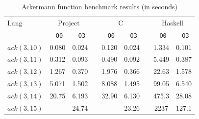 \begin{table}\centering
    \renewcommand{\arraystretch}{1.3}
    \label{tab:ackermann-benchmark}
    \caption{Ackermann function benchmark results (in seconds)}

    \begin{tabular}{@{}lcccccccc@{}} \toprule
        Lang        & \multicolumn{2}{c}{Project} &              & \multicolumn{2}{c}{C} &              & \multicolumn{2}{c}{Haskell}                                  \\
        \cmidrule{2-3} \cmidrule{5-6} \cmidrule{8-9}
                    & \texttt{-O0}                & \texttt{-O3} &                       & \texttt{-O0} & \texttt{-O3}                &  & \texttt{-O0} & \texttt{-O3} \\ \midrule
        $ack(3,10)$ & 0.080                       & 0.024        &                       & 0.120        & 0.024                       &  & 1.334        & 0.101        \\
        $ack(3,11)$ & 0.312                       & 0.093        &                       & 0.490        & 0.092                       &  & 5.449        & 0.387        \\
        $ack(3,12)$ & 1.267                       & 0.370        &                       & 1.976        & 0.366                       &  & 22.63        & 1.578        \\
        $ack(3,13)$ & 5.071                       & 1.502        &                       & 8.088        & 1.495                       &  & 99.05        & 6.540        \\
        $ack(3,14)$ & 20.75                       & 6.193        &                       & 32.90        & 6.130                       &  & 475.3        & 28.08        \\
        $ack(3,15)$ & --                          & 24.74        &                       & --           & 23.26                       &  & 2237         & 127.1        \\
        \bottomrule
    \end{tabular}
\end{table}

